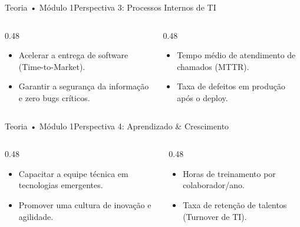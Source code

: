 \begin{senaiframe}{Teoria • Módulo 1}{Perspectiva 3: Processos Internos de TI}
  \begin{columns}[t]
    \begin{column}{0.48\textwidth}
      \begin{tcolorbox}[senairedcard, title={Objetivos Típicos}]
        \begin{itemize}
          \item Acelerar a entrega de software (Time-to-Market).
          \item Garantir a segurança da informação e zero bugs críticos.
        \end{itemize}
      \end{tcolorbox}
    \end{column}
    \begin{column}{0.48\textwidth}
      \begin{tcolorbox}[senaicard, title={Indicadores Chave}]
        \begin{itemize}
          \item Tempo médio de atendimento de chamados (MTTR).
          \item Taxa de defeitos em produção após o deploy.
        \end{itemize}
      \end{tcolorbox}
    \end{column}
  \end{columns}
\end{senaiframe}

\begin{senaiframe}{Teoria • Módulo 1}{Perspectiva 4: Aprendizado \& Crescimento}
  \begin{columns}[t]
    \begin{column}{0.48\textwidth}
      \begin{tcolorbox}[senaiambercard, title={Objetivos Típicos}]
        \begin{itemize}
          \item Capacitar a equipe técnica em tecnologias emergentes.
          \item Promover uma cultura de inovação e agilidade.
        \end{itemize}
      \end{tcolorbox}
    \end{column}
    \begin{column}{0.48\textwidth}
      \begin{tcolorbox}[senaigreencard, title={Indicadores Chave}]
        \begin{itemize}
          \item Horas de treinamento por colaborador/ano.
          \item Taxa de retenção de talentos (Turnover de TI).
        \end{itemize}
      \end{tcolorbox}
    \end{column}
  \end{columns}
\end{senaiframe}

